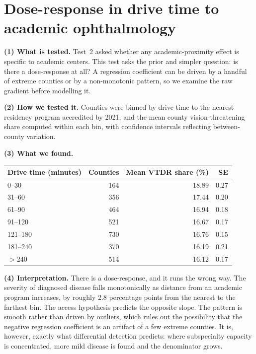 \documentclass[11pt]{article}
\newcommand{\tpart}[1]{\medskip\noindent\textbf{#1}\quad}
\begin{document}
\section{Dose-response in drive time to academic ophthalmology}

\tpart{(1) What is tested.} Test~2 asked whether any academic-proximity effect
is specific to academic centers. This test asks the prior and simpler question:
is there a dose-response at all? A regression coefficient can be driven by a
handful of extreme counties or by a non-monotonic pattern, so we examine the
raw gradient before modelling it.

\tpart{(2) How we tested it.} Counties were binned by drive time to the nearest
residency program accredited by 2021, and the mean county vision-threatening
share computed within each bin, with confidence intervals reflecting
between-county variation.

\tpart{(3) What we found.}
\begin{center}
\begin{tabular}{lrrr}
\toprule
Drive time (minutes) & Counties & Mean VTDR share (\%) & SE \\
\midrule
0--30    & 164 & 18.89 & 0.27 \\
31--60   & 356 & 17.44 & 0.20 \\
61--90   & 464 & 16.94 & 0.18 \\
91--120  & 521 & 16.67 & 0.17 \\
121--180 & 730 & 16.76 & 0.15 \\
181--240 & 370 & 16.19 & 0.21 \\
$>$240   & 514 & 16.12 & 0.17 \\
\bottomrule
\end{tabular}
\end{center}

\tpart{(4) Interpretation.} There is a dose-response, and it runs the wrong way.
The severity of diagnosed disease falls monotonically as distance from an
academic program increases, by roughly 2.8 percentage points from the nearest to
the farthest bin. The access hypothesis predicts the opposite slope. The pattern
is smooth rather than driven by outliers, which rules out the possibility that
the negative regression coefficient is an artifact of a few extreme counties. It
is, however, exactly what differential detection predicts: where subspecialty
capacity is concentrated, more mild disease is found and the denominator grows.
\end{document}
